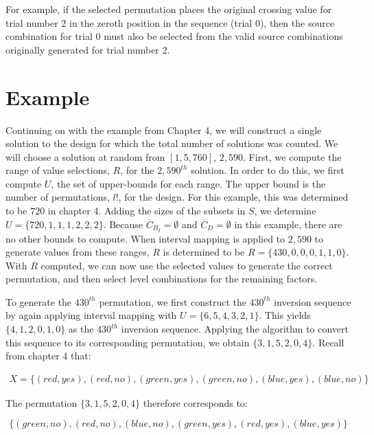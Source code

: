 For example, if the selected permutation places the original crossing value for trial number 2 in the zeroth position in the sequence (trial 0), then the source combination for trial 0 must also be selected from the valid source combinations originally generated for trial number 2.


\section{Example}

Continuing on with the example from Chapter 4, we will construct a single solution to the design for which the total number of solutions was counted. We will choose a solution at random from $[1, 5,760]$, $2,590$. First, we compute the range of value selections, $R$, for the $2,590^{th}$ solution. In order to do this, we first compute $U$, the set of upper-bounds for each range. The upper bound is the number of permutations, $l!$, for the design. For this example, this was determined to be $720$ in chapter 4. Adding the sizes of the subsets in $S$, we determine $U = \{720, 1, 1, 1, 2, 2, 2\}$. Because $\overline{C}_{B_I} = \emptyset$ and $\overline{C}_D = \emptyset$ in this example, there are no other bounds to compute. When interval mapping is applied to $2,590$ to generate values from these ranges, $R$ is determined to be $R = \{430, 0, 0, 0, 1, 1, 0\}$. With $R$ computed, we can now use the selected values to generate the correct permutation, and then select level combinations for the remaining factors.

To generate the $430^{th}$ permutation, we first construct the $430^{th}$ inversion sequence by again applying interval mapping with $U = \{6, 5, 4, 3, 2, 1\}$. This yields $\{4, 1, 2, 0, 1 ,0\}$ as the $430^{th}$ inversion sequence. Applying the algorithm to convert this sequence to its corresponding permutation, we obtain $\{3, 1, 5, 2, 0, 4\}$. Recall from chapter 4 that:

\begin{align*}
X = \{(red, yes), (red, no), (green, yes), (green, no), (blue, yes), (blue, no)\}
\end{align*}

The permutation $\{3, 1, 5, 2, 0, 4\}$ therefore corresponds to:

\[
	\{(green, no), (red, no), (blue, no), (green, yes), (red, yes), (blue, yes)\}
\]



